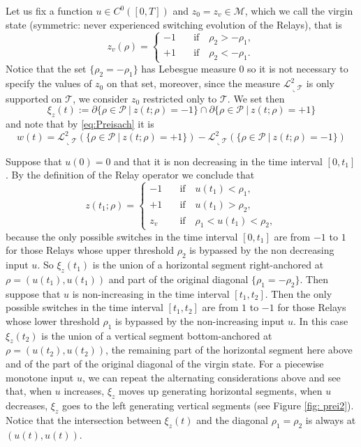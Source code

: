 \documentclass[12pt]{article}
\newcommand{\M}{\mathcal{M}}
\newcommand{\LM}{\mathscr{L}}
\newcommand{\T}{\mathcal{T}}
\newcommand{\PP}{\mathcal{P}}
\newcommand{\p}{\rho}
\newcommand{\1}{\mathds{1}}
\theoremstyle{definition}
\begin{document}
 Let us fix a function $u \in C^0([0,T])$ and $z_0=z_v \in \M$,
 which we call the virgin state (symmetric: never experienced switching evolution of the Relays), that is \begin{equation}
    z_v(\p)= \begin{cases}
        -1 \quad &\text{if} \quad \p_2 > - \p_1,\\
        +1 \quad &\text{if} \quad \p_2 < - \p_1.
    \end{cases}
\end{equation} Notice that the set $\{\p_2=-\p_1\}$ has Lebesgue measure $0$ so it is not necessary to specify the values of $z_0$ on that set, moreover, since the measure $\LM^2_{\llcorner \T}$ is only supported on $\T$, we consider $z_0$ restricted only to $\T$. We set then 
\begin{equation}
    \label{eq:csi}
\xi_z(t):=\partial \{ \p \in \PP ~|~ z(t;\p) =-1 \}\cap \partial \{ \p \in \PP ~|~ z(t;\p) =+1\}
\end{equation}
and note that by \eqref{eq:Preisach} it is
\begin{equation}
    \label{eq:w}
w(t)=\LM^2_{\llcorner \T}\left(\{ \p \in \PP ~|~ z(t;\p) =+1\}\right)-\LM^2_{\llcorner \T}\left(\{ \p \in \PP ~|~ z(t;\p) =-1 \}\right)
\end{equation}


Suppose that $u(0)=0$ and that it is non decreasing in the time interval $[0,t_1]$. By the definition of the Relay operator we conclude that  \begin{equation}\label{eq: zpp} z(t_1;\p)=
    \begin{cases}
        -1 \quad & \text{if} \quad u(t_1)< \p_1,\\
        +1 \quad & \text{if} \quad u(t_1) > \p_2,\\
        z_v \quad & \text{if} \quad \p_1<u(t_1)<\p_2,
    \end{cases}
\end{equation}
because the only possible switches in the time interval $[0,t_1]$ are from $-1$ to $1$ for those Relays whose upper threshold $\rho_2$ is bypassed by the non decreasing input $u$.
So $\xi_z(t_1)$ is the union of a horizontal segment right-anchored at $\rho=(u(t_1),u(t_1))$ and part of the original diagonal $\{\p_1=-\p_2\}$. Then suppose that $u$ is non-increasing in the time interval $[t_1,t_2]$. Then the only possible switches in the time interval $[t_1,t_2]$ are from $1$ to $-1$ for those Relays whose lower threshold $\rho_1$ is bypassed by the non-increasing input $u$. In this case $\xi_z(t_2)$ is the union of a vertical segment bottom-anchored at $\rho=(u(t_2),u(t_2))$, the remaining part of the horizontal segment here above and of the part of the original diagonal of the virgin state. For a piecewise monotone input $u$, we can repeat the alternating considerations above and see that, when $u$ increases, $\xi_z$ moves up generating horizontal segments, when $u$ decreases, $\xi_z$ goes to the left generating vertical segments (see Figure \ref{fig: prei2}). Notice that the intersection between $\xi_z(t)$ and the diagonal $\p_1=\p_2$ is always at $(u(t), u(t)).$ 
\end{document}
